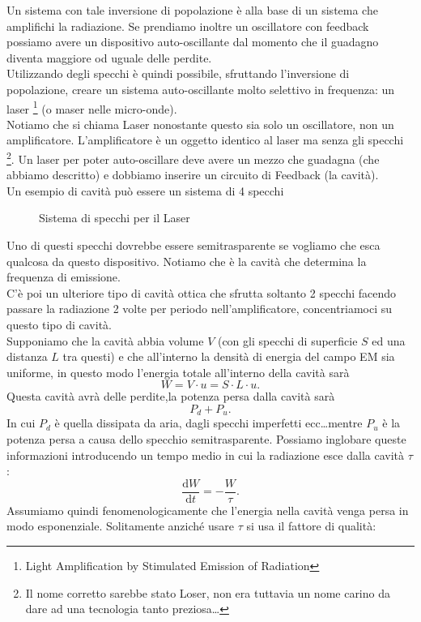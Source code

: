 Un sistema con tale inversione di popolazione è alla base di un sistema che amplifichi la radiazione. Se prendiamo inoltre un oscillatore con feedback possiamo avere un dispositivo auto-oscillante dal momento che il guadagno diventa maggiore od uguale delle perdite.\\
Utilizzando degli specchi è quindi possibile, sfruttando l'inversione di popolazione, creare un sistema auto-oscillante molto selettivo in frequenza: un laser
\footnote{Light Amplification by Stimulated Emission of Radiation} 
(o maser nelle micro-onde). \\ 
Notiamo che si chiama Laser nonostante questo sia solo un oscillatore, non un amplificatore. L'amplificatore è un oggetto identico al laser ma senza gli specchi
\footnote{Il nome corretto sarebbe stato Loser, non era tuttavia un nome carino da dare ad una tecnologia tanto preziosa\ldots}.
Un laser per poter auto-oscillare deve avere un mezzo che guadagna (che abbiamo descritto) e dobbiamo inserire un circuito di Feedback (la cavità).\\
Un esempio di cavità può essere un sistema di 4 specchi
\begin{figure}[H]
    \centering
    \caption{Sistema di specchi per il Laser}
    \label{fig:sistema-di-specchi-per-il-laser}
\end{figure}
Uno di questi specchi dovrebbe essere semitrasparente se vogliamo che esca qualcosa da questo dispositivo. Notiamo che è la cavità che determina la frequenza di emissione.\\
C'è poi un ulteriore tipo di cavità ottica che sfrutta soltanto 2 specchi facendo passare la radiazione 2 volte per periodo nell'amplificatore, concentriamoci su questo tipo di cavità.\\
Supponiamo che la cavità abbia volume $V$ (con gli specchi di superficie $S$ ed una distanza $L$ tra questi)  e che all'interno la densità di energia del campo EM sia uniforme, in questo modo l'energia totale all'interno della cavità sarà
\[
W = V\cdot u = S\cdot L\cdot u
.\] 
Questa cavità avrà delle perdite,la potenza persa dalla cavità sarà
\[
P_d+P_u
.\] 
In cui $P_d$  è quella dissipata da aria, dagli specchi imperfetti ecc\ldots mentre $P_u$  è la potenza persa a causa dello specchio semitrasparente.
Possiamo inglobare queste informazioni introducendo un tempo medio in cui la radiazione esce dalla cavità $\tau$:
\[
\frac{\text{d} W}{\text{d} t} = - \frac{W}{\tau}
.\] 
Assumiamo quindi fenomenologicamente che l'energia nella cavità venga persa in modo esponenziale. Solitamente anziché usare $\tau$  si usa il fattore di qualità:
